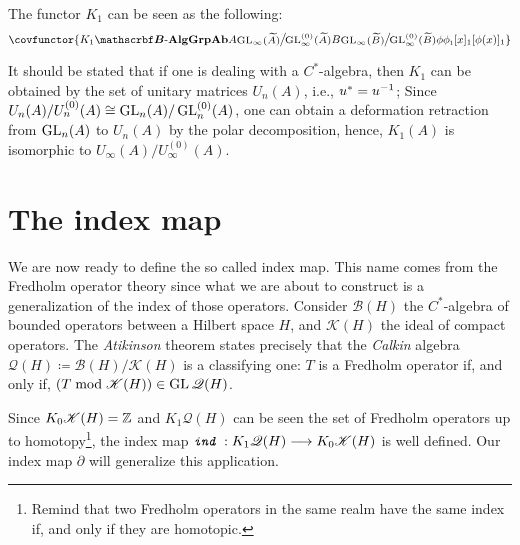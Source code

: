 \begin{definicao}
    The functor $K_1$ can be seen as the following:
    \begin{equation*}
        \covfunctor{{K_1}{\BAlg}{\Ab{\Grp}}{A}{\mfrac{\GL_\infty(\widetilde A)}{\GL_\infty^{(0)}(\widetilde A)}}{B}{\mfrac{\GL_\infty(\widetilde B)}{\GL_\infty^{(0)}(\widetilde B)}}{\phi}{\sub\phi1}{[x]_1}{[\phi(x)]_1}}
    \end{equation*}
\end{definicao}

\begin{observacao}
    It should be stated that if one is dealing with a $C^*$-algebra, then $K_1$ can be obtained by the set of unitary matrices $U_n(A)$, i.e., $u^* = {u}^{-1}$; Since $U_n(A)/U_n^{(0)}(A) \cong \operatorname{GL}_n(A)/\operatorname{GL}_n^{(0)}(A)$, one can obtain a deformation retraction from $\operatorname{GL}_n(A)$ to $U_n(A)$ by the polar decomposition, hence, $K_1(A)$ is isomorphic to $U_\infty(A)/U_\infty^{(0)}(A)$.  
\end{observacao}


\section{The index map}

We are now ready to define the so called index map. This name comes from the Fredholm operator theory since what we are about to construct is a generalization of the index of those operators. Consider $\mathscr B(H)$ the $C^*$-algebra of bounded operators between a Hilbert space $H$, and $\mathscr K(H)$ the ideal of compact operators. The \textit{Atikinson} theorem states precisely that the \textit{Calkin} algebra $\mathscr Q(H) \coloneqq \mathscr B(H)/\mathscr K(H)$ is a classifying one: $T$ is a Fredholm operator if, and only if, $(T \bmod \mathscr K(H)) \in \operatorname{GL} \mathscr Q(H)$.

Since $K_0\mathscr K(H) = \operatorname{\mathbb{Z}}$ and $K_1\mathscr Q(H)$ can be seen the set of Fredholm operators up to homotopy\footnote{Remind that two Fredholm operators in the same realm have the same index if, and only if they are homotopic.}, the index map $\texttt{\textit{ind}}\, : K_1\mathscr Q(H) \longrightarrow K_0\mathscr K(H)$ is well defined. Our index map $\partial$ will generalize this application. 

